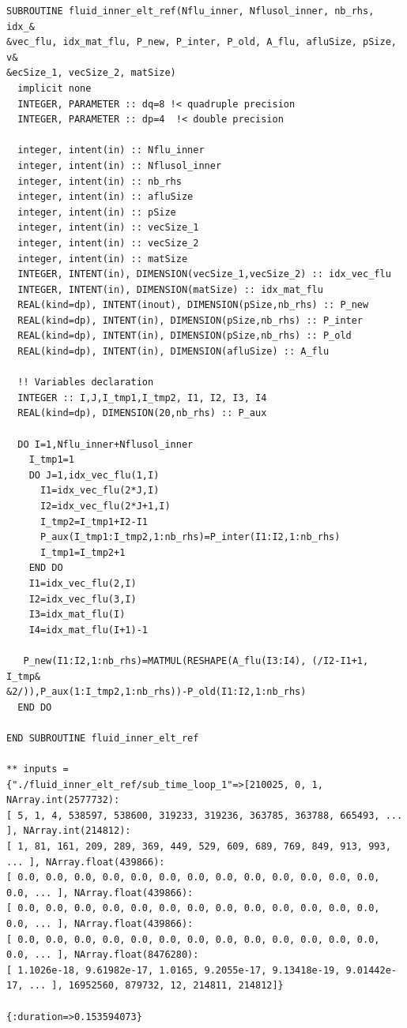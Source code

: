 \documentclass[10pt,twoside]{article}   	%
\begin{document}
\begin{lstlisting}[caption=Results (obtained with the command ruby run\_ref.rb)]
SUBROUTINE fluid_inner_elt_ref(Nflu_inner, Nflusol_inner, nb_rhs, idx_&
&vec_flu, idx_mat_flu, P_new, P_inter, P_old, A_flu, afluSize, pSize, v&
&ecSize_1, vecSize_2, matSize)
  implicit none
  INTEGER, PARAMETER :: dq=8 !< quadruple precision
  INTEGER, PARAMETER :: dp=4  !< double precision

  integer, intent(in) :: Nflu_inner
  integer, intent(in) :: Nflusol_inner
  integer, intent(in) :: nb_rhs
  integer, intent(in) :: afluSize
  integer, intent(in) :: pSize
  integer, intent(in) :: vecSize_1
  integer, intent(in) :: vecSize_2
  integer, intent(in) :: matSize
  INTEGER, INTENT(in), DIMENSION(vecSize_1,vecSize_2) :: idx_vec_flu
  INTEGER, INTENT(in), DIMENSION(matSize) :: idx_mat_flu
  REAL(kind=dp), INTENT(inout), DIMENSION(pSize,nb_rhs) :: P_new
  REAL(kind=dp), INTENT(in), DIMENSION(pSize,nb_rhs) :: P_inter
  REAL(kind=dp), INTENT(in), DIMENSION(pSize,nb_rhs) :: P_old
  REAL(kind=dp), INTENT(in), DIMENSION(afluSize) :: A_flu

  !! Variables declaration
  INTEGER :: I,J,I_tmp1,I_tmp2, I1, I2, I3, I4
  REAL(kind=dp), DIMENSION(20,nb_rhs) :: P_aux

  DO I=1,Nflu_inner+Nflusol_inner
    I_tmp1=1
    DO J=1,idx_vec_flu(1,I)
      I1=idx_vec_flu(2*J,I)
      I2=idx_vec_flu(2*J+1,I)
      I_tmp2=I_tmp1+I2-I1
      P_aux(I_tmp1:I_tmp2,1:nb_rhs)=P_inter(I1:I2,1:nb_rhs)
      I_tmp1=I_tmp2+1
    END DO
    I1=idx_vec_flu(2,I)
    I2=idx_vec_flu(3,I)
    I3=idx_mat_flu(I)
    I4=idx_mat_flu(I+1)-1

   P_new(I1:I2,1:nb_rhs)=MATMUL(RESHAPE(A_flu(I3:I4), (/I2-I1+1, I_tmp&
&2/)),P_aux(1:I_tmp2,1:nb_rhs))-P_old(I1:I2,1:nb_rhs)
  END DO

END SUBROUTINE fluid_inner_elt_ref

** inputs =
{"./fluid_inner_elt_ref/sub_time_loop_1"=>[210025, 0, 1, NArray.int(2577732): 
[ 5, 1, 4, 538597, 538600, 319233, 319236, 363785, 363788, 665493, ... ], NArray.int(214812): 
[ 1, 81, 161, 209, 289, 369, 449, 529, 609, 689, 769, 849, 913, 993, ... ], NArray.float(439866): 
[ 0.0, 0.0, 0.0, 0.0, 0.0, 0.0, 0.0, 0.0, 0.0, 0.0, 0.0, 0.0, 0.0, 0.0, ... ], NArray.float(439866): 
[ 0.0, 0.0, 0.0, 0.0, 0.0, 0.0, 0.0, 0.0, 0.0, 0.0, 0.0, 0.0, 0.0, 0.0, ... ], NArray.float(439866): 
[ 0.0, 0.0, 0.0, 0.0, 0.0, 0.0, 0.0, 0.0, 0.0, 0.0, 0.0, 0.0, 0.0, 0.0, ... ], NArray.float(8476280): 
[ 1.1026e-18, 9.61982e-17, 1.0165, 9.2055e-17, 9.13418e-19, 9.01442e-17, ... ], 16952560, 879732, 12, 214811, 214812]}

{:duration=>0.153594073}
\end{lstlisting}
\end{document}
